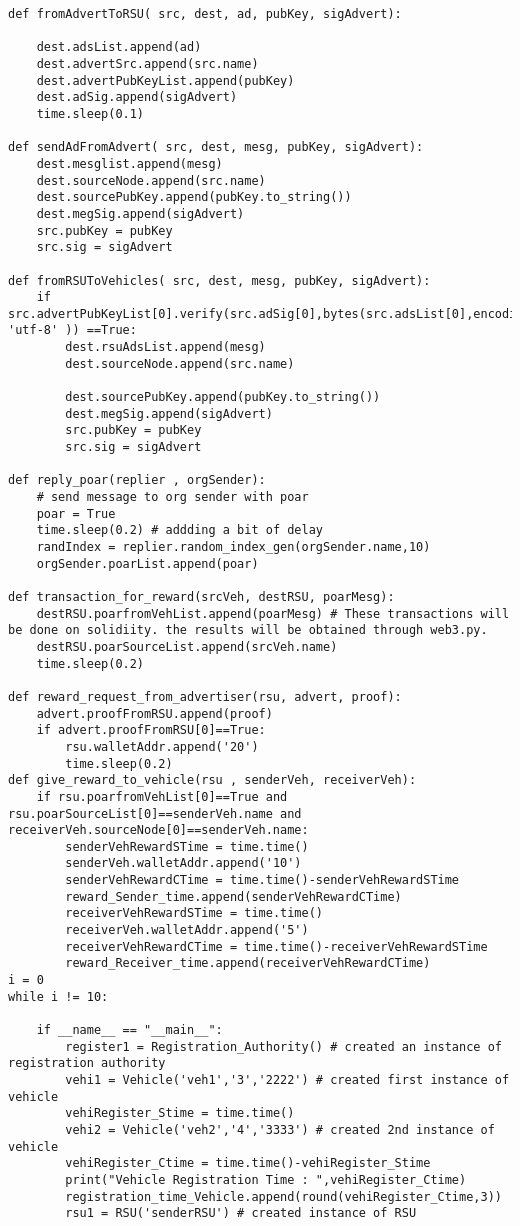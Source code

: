 \begin{linenumbers}
\begin{lstlisting}
def fromAdvertToRSU( src, dest, ad, pubKey, sigAdvert):

    dest.adsList.append(ad)
    dest.advertSrc.append(src.name)
    dest.advertPubKeyList.append(pubKey)
    dest.adSig.append(sigAdvert)
    time.sleep(0.1)

def sendAdFromAdvert( src, dest, mesg, pubKey, sigAdvert):
    dest.mesglist.append(mesg)
    dest.sourceNode.append(src.name)
    dest.sourcePubKey.append(pubKey.to_string())
    dest.megSig.append(sigAdvert)
    src.pubKey = pubKey
    src.sig = sigAdvert

def fromRSUToVehicles( src, dest, mesg, pubKey, sigAdvert):
    if src.advertPubKeyList[0].verify(src.adSig[0],bytes(src.adsList[0],encoding= 'utf-8' )) ==True:
        dest.rsuAdsList.append(mesg)
        dest.sourceNode.append(src.name)
        
        dest.sourcePubKey.append(pubKey.to_string())
        dest.megSig.append(sigAdvert)
        src.pubKey = pubKey
        src.sig = sigAdvert

def reply_poar(replier , orgSender):
    # send message to org sender with poar
    poar = True
    time.sleep(0.2) # addding a bit of delay 
    randIndex = replier.random_index_gen(orgSender.name,10)
    orgSender.poarList.append(poar)

def transaction_for_reward(srcVeh, destRSU, poarMesg):
    destRSU.poarfromVehList.append(poarMesg) # These transactions will be done on solidiity. the results will be obtained through web3.py.
    destRSU.poarSourceList.append(srcVeh.name)
    time.sleep(0.2)

def reward_request_from_advertiser(rsu, advert, proof):
    advert.proofFromRSU.append(proof)
    if advert.proofFromRSU[0]==True:
        rsu.walletAddr.append('20')
        time.sleep(0.2)
def give_reward_to_vehicle(rsu , senderVeh, receiverVeh):
    if rsu.poarfromVehList[0]==True and rsu.poarSourceList[0]==senderVeh.name and receiverVeh.sourceNode[0]==senderVeh.name:
        senderVehRewardSTime = time.time()
        senderVeh.walletAddr.append('10')
        senderVehRewardCTime = time.time()-senderVehRewardSTime
        reward_Sender_time.append(senderVehRewardCTime)
        receiverVehRewardSTime = time.time()
        receiverVeh.walletAddr.append('5')
        receiverVehRewardCTime = time.time()-receiverVehRewardSTime
        reward_Receiver_time.append(receiverVehRewardCTime)
i = 0
while i != 10:

    if __name__ == "__main__":
        register1 = Registration_Authority() # created an instance of registration authority
        vehi1 = Vehicle('veh1','3','2222') # created first instance of vehicle
        vehiRegister_Stime = time.time()
        vehi2 = Vehicle('veh2','4','3333') # created 2nd instance of vehicle
        vehiRegister_Ctime = time.time()-vehiRegister_Stime
        print("Vehicle Registration Time : ",vehiRegister_Ctime)
        registration_time_Vehicle.append(round(vehiRegister_Ctime,3))
        rsu1 = RSU('senderRSU') # created instance of RSU


\end{lstlisting}
\end{linenumbers}
